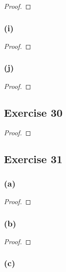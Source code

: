 \documentclass[14pt]{extarticle}
\begin{document}
\begin{proof}

\end{proof}

\subsubsection{(i)}

\begin{proof}

\end{proof}

\subsubsection{(j)}

\begin{proof}

\end{proof}

\subsection{Exercise 30}

\begin{proof}

\end{proof}

\subsection{Exercise 31}

\subsubsection{(a)}

\begin{proof}

\end{proof}

\subsubsection{(b)}

\begin{proof}

\end{proof}

\subsubsection{(c)}
\end{document}
